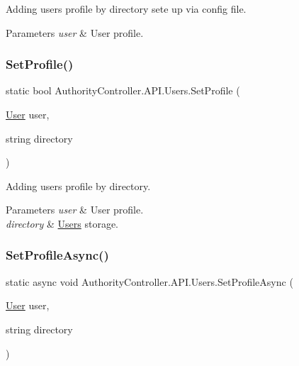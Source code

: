 Adding user\textquotesingle{}s profile by directory sete up via config file. 


\begin{DoxyParams}{Parameters}
{\em user} & User profile.\\
\hline
\end{DoxyParams}
\mbox{\label{class_authority_controller_1_1_a_p_i_1_1_users_a6896c020fbcaf19c54962c7c769502e4}} 
\subsubsection{\texorpdfstring{Set\+Profile()}{SetProfile()}\hspace{0.1cm}{\footnotesize\ttfamily [2/2]}}
{\footnotesize\ttfamily static bool Authority\+Controller.\+A\+P\+I.\+Users.\+Set\+Profile (\begin{DoxyParamCaption}\item[{\mbox{\hyperlink{class_authority_controller_1_1_data_1_1_user}{User}}}]{user,  }\item[{string}]{directory }\end{DoxyParamCaption})\hspace{0.3cm}{\ttfamily [static]}}



Adding user\textquotesingle{}s profile by directory. 


\begin{DoxyParams}{Parameters}
{\em user} & User profile.\\
\hline
{\em directory} & \mbox{\hyperlink{class_authority_controller_1_1_a_p_i_1_1_users}{Users}} storage.\\
\hline
\end{DoxyParams}
\mbox{\label{class_authority_controller_1_1_a_p_i_1_1_users_a3ed2ca9e5bb026c907894da4160b5e5e}} 
\subsubsection{\texorpdfstring{Set\+Profile\+Async()}{SetProfileAsync()}}
{\footnotesize\ttfamily static async void Authority\+Controller.\+A\+P\+I.\+Users.\+Set\+Profile\+Async (\begin{DoxyParamCaption}\item[{\mbox{\hyperlink{class_authority_controller_1_1_data_1_1_user}{User}}}]{user,  }\item[{string}]{directory }\end{DoxyParamCaption})\hspace{0.3cm}{\ttfamily [static]}}



